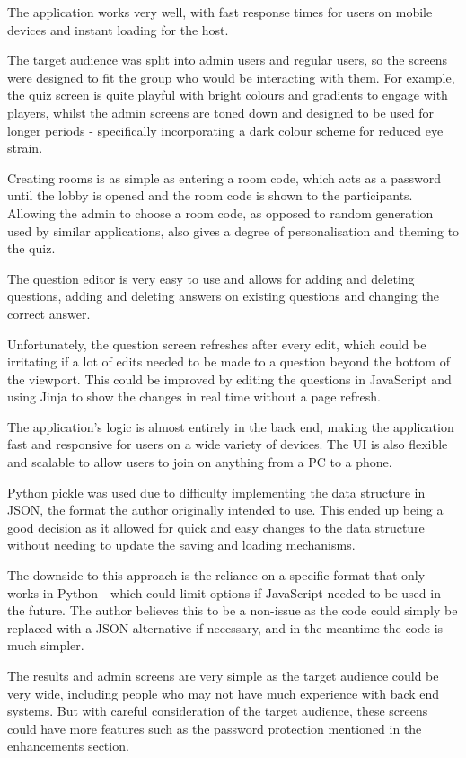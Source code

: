\documentclass[10pt, a4paper]{article}
\begin{document}
	The application works very well, with fast response times for users on mobile devices and instant loading for the host.
	
	The target audience was split into admin users and regular users, so the screens were designed to fit the group who would be interacting with them. For example, the quiz screen is quite playful with bright colours and gradients to engage with players, whilst the admin screens are toned down and designed to be used for longer periods - specifically incorporating a dark colour scheme for reduced eye strain.
	
	Creating rooms is as simple as entering a room code, which acts as a password until the lobby is opened and the room code is shown to the participants. Allowing the admin to choose a room code, as opposed to random generation used by similar applications, also gives a degree of personalisation and theming to the quiz.
	
	The question editor is very easy to use and allows for adding and deleting questions, adding and deleting answers on existing questions and changing the correct answer.
	
	Unfortunately, the question screen refreshes after every edit, which could be irritating if a lot of edits needed to be made to a question beyond the bottom of the viewport. This could be improved by editing the questions in JavaScript and using Jinja to show the changes in real time without a page refresh.
	
	The application's logic is almost entirely in the back end, making the application fast and responsive for users on a wide variety of devices. The UI is also flexible and scalable to allow users to join on anything from a PC to a phone.
	
	Python pickle was used due to difficulty implementing the data structure in JSON, the format the author originally intended to use. This ended up being a good decision as it allowed for quick and easy changes to the data structure without needing to update the saving and loading mechanisms. 
	
	The downside to this approach is the reliance on a specific format that only works in Python - which could limit options if JavaScript needed to be used in the future. The author believes this to be a non-issue as the code could simply be replaced with a JSON alternative if necessary, and in the meantime the code is much simpler.
	
	The results and admin screens are very simple as the target audience could be very wide, including people who may not have much experience with back end systems. But with careful consideration of the target audience, these screens could have more features such as the password protection mentioned in the enhancements section. 
	
\end{document}
